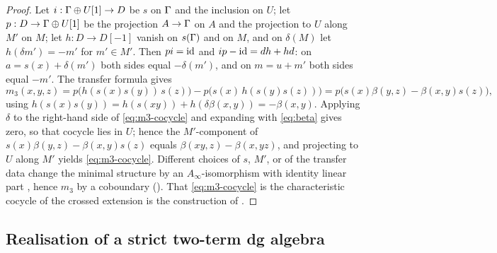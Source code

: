 \begin{proof}
Let \(i:\Gamma\oplus U[1]\to D\) be \(s\) on \(\Gamma\) and the inclusion on \(U\); let \(p:D\to\Gamma\oplus U[1]\) be the projection \(A\to\Gamma\) on \(A\) and the projection to \(U\) along \(M'\) on \(M\); let \(h:D\to D[-1]\) vanish on \(s(\Gamma)\) and on \(M\), and on \(\delta(M)\) let \(h(\delta m')=-m'\) for \(m'\in M'\).  Then \(pi=\operatorname{id}\) and \(ip-\operatorname{id}=dh+hd\): on \(a=s(x)+\delta(m')\) both sides equal \(-\delta(m')\), and on \(m=u+m'\) both sides equal \(-m'\).  The transfer formula gives
\[
 m_3(x,y,z)=p\bigl(h(s(x)s(y))\,s(z)\bigr)-p\bigl(s(x)\,h(s(y)s(z))\bigr)
 =p\bigl(s(x)\beta(y,z)-\beta(x,y)s(z)\bigr),
\]
using \(h(s(x)s(y))=h(s(xy))+h(\delta\beta(x,y))=-\beta(x,y)\).  Applying \(\delta\) to the right-hand side of \eqref{eq:m3-cocycle} and expanding with \eqref{eq:beta} gives zero, so that cocycle lies in \(U\); hence the \(M'\)-component of \(s(x)\beta(y,z)-\beta(x,y)s(z)\) equals \(\beta(xy,z)-\beta(x,yz)\), and projecting to \(U\) along \(M'\) yields \eqref{eq:m3-cocycle}.  Different choices of \(s\), \(M'\), or of the transfer data change the minimal structure by an \(A_\infty\)-isomorphism with identity linear part \cite[Section~3.3]{Keller01Ainf}, hence \(m_3\) by a coboundary ().  That \eqref{eq:m3-cocycle} is the characteristic cocycle of the crossed extension is the construction of \cite[Section~3]{BauesMinian02}.
\end{proof}

\subsection{Realisation of a strict two-term dg algebra}

